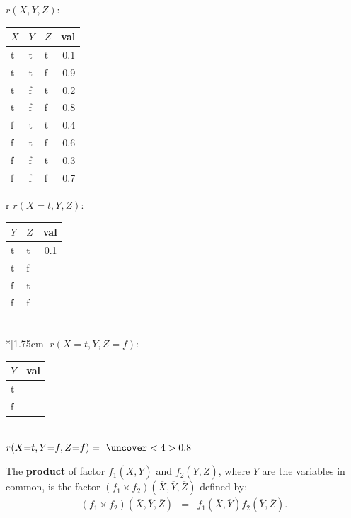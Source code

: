 \documentclass[12pt]{beamer} %
\begin{document}
\begin{slide}
$r(X,Y,Z)$:\begin{tabular}{|lll|r|}
\hline
$X$ & $Y$ &$Z$ & val\\\hline
t & t & t & 0.1\\
t & t & f & 0.9\\
t & f & t & 0.2\\
t & f & f & 0.8\\
f & t & t & 0.4\\
f & t & f & 0.6\\
f & f & t & 0.3\\
f & f & f & 0.7\\\hline
\end{tabular}
\begin{tabular}{r}
$r(X{=}t,Y,Z)$:\begin{tabular}{|ll|r|}
\hline
$Y$ &$Z$ & val\\\hline
t & t & 0.1\\
t & f & \uncover<2>{0.9}\\
f & t &  \uncover<2>{0.2}\\
f & f &  \uncover<2>{0.8}\\
\hline
\end{tabular}\\*[1.75cm]
\pause
$r(X{=}t,Y,Z{=}f)$:\pause\begin{tabular}{|l|r|}
\hline
$Y$ & val\\\hline
t &  \uncover<4>{0.9}\\
f &  \uncover<4>{0.8}\\\hline
\end{tabular}\\
$r(X{=}t,Y{=}f,Z{=}f)=\ \uncover<4>{0.8}$
\end{tabular}


\end{slide}


\begin{slide}
The  \textbf{product} of factor $f_1(\overline{X},\overline{Y})$ and
$f_2(\overline{Y},\overline{Z})$, where $\overline{Y}$ are the
variables in common, is the factor $(f_1 \times
f_2)(\overline{X},\overline{Y},\overline{Z})$ defined by:
\begin{eqnarray*}
(f_1 \times f_2)(\overline{X},\overline{Y},\overline{Z}) %
&=&
f_1(\overline{X},\overline{Y}) f_2(\overline{Y},\overline{Z}).
\end{eqnarray*}

\end{slide}
\end{document}
